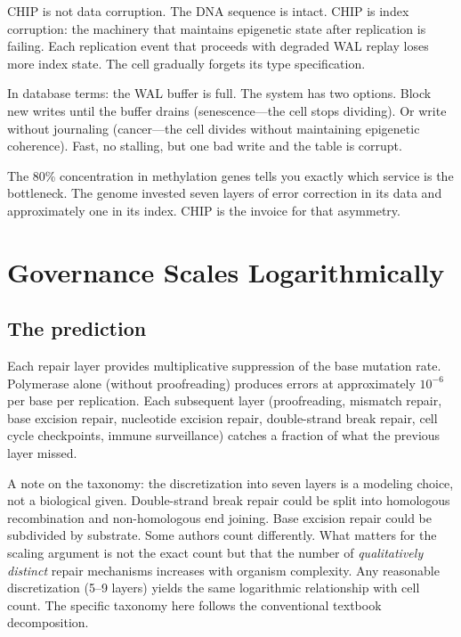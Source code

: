 \documentclass[11pt]{article}
\theoremstyle{definition}
\begin{document}
CHIP is not data corruption. The DNA sequence is intact. CHIP is
index corruption: the machinery that maintains epigenetic state after
replication is failing. Each replication event that proceeds with
degraded WAL replay loses more index state. The cell gradually
forgets its type specification.

In database terms: the WAL buffer is full. The system has two options.
Block new writes until the buffer drains (senescence---the cell stops
dividing). Or write without journaling (cancer---the cell divides
without maintaining epigenetic coherence). Fast, no stalling, but one
bad write and the table is corrupt.

The 80\% concentration in methylation genes tells you exactly which
service is the bottleneck. The genome invested seven layers of error
correction in its data and approximately one in its index. CHIP is
the invoice for that asymmetry.

\section{Governance Scales Logarithmically}
\label{sec:governance}

\subsection{The prediction}

Each repair layer provides multiplicative suppression of the base
mutation rate. Polymerase alone (without proofreading) produces errors
at approximately $10^{-6}$ per base per replication. Each subsequent
layer (proofreading, mismatch repair, base excision repair, nucleotide
excision repair, double-strand break repair, cell cycle checkpoints,
immune surveillance) catches a fraction of what the previous layer
missed.

A note on the taxonomy: the discretization into seven layers is a
modeling choice, not a biological given. Double-strand break repair
could be split into homologous recombination and non-homologous end
joining. Base excision repair could be subdivided by substrate. Some
authors count differently. What matters for the scaling argument is
not the exact count but that the number of \emph{qualitatively distinct}
repair mechanisms increases with organism complexity. Any reasonable
discretization (5--9 layers) yields the same logarithmic relationship
with cell count. The specific taxonomy here follows the conventional
textbook decomposition.
\end{document}
